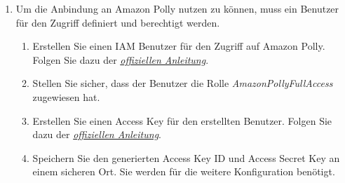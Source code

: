 \begin{enumerate}
    \item Um die Anbindung an Amazon Polly nutzen zu können, muss ein Benutzer für den Zugriff definiert und berechtigt werden.
    \begin{enumerate}
        \item Erstellen Sie einen IAM Benutzer für den Zugriff auf Amazon Polly. Folgen Sie dazu der \href{https://aws.amazon.com/premiumsupport/knowledge-center/create-access-key/}{\textit{offiziellen Anleitung}}.
        \item Stellen Sie sicher, dass der Benutzer die Rolle \textit{AmazonPollyFullAccess} zugewiesen hat.
        \item Erstellen Sie einen Access Key für den erstellten Benutzer. Folgen Sie dazu der \href{https://aws.amazon.com/premiumsupport/knowledge-center/create-access-key/}{\textit{offiziellen Anleitung}}.
        \item Speichern Sie den generierten Access Key ID und Access Secret Key an einem sicheren Ort. Sie werden für die weitere Konfiguration benötigt.
    \end{enumerate}


\end{enumerate}
